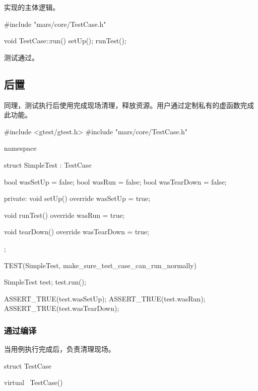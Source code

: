\begin{content}
实现的主体逻辑。

\begin{leftbar}
 \begin{c++}[caption={\ttfamily{src/mars/core/TestCase.cc}}]
#include "mars/core/TestCase.h"

void TestCase::run() {
  setUp();
  runTest();
}
 \end{c++}
\end{leftbar}

测试通过。

\subsection{后置}

同理，测试执行后使用完成现场清理，释放资源。用户通过定制私有的虚函数完成此功能。

\begin{leftbar}
 \begin{c++}[caption={\ttfamily{test/mars/core/TestCaseSpec.cc}}]
#include <gtest/gtest.h>
#include "mars/core/TestCase.h"

namespace {
  struct SimpleTest : TestCase {
    bool wasSetUp = false;
    bool wasRun = false;
    bool wasTearDown = false;

  private:
    void setUp() override {
      wasSetUp = true;
    }

    void runTest() override {
      wasRun = true;
    }

    void tearDown() override {
      wasTearDown = true;
    }
  };
}

TEST(SimpleTest, make_sure_test_case_can_run_normally) {
  SimpleTest test;
  test.run();

  ASSERT_TRUE(test.wasSetUp);
  ASSERT_TRUE(test.wasRun);
  ASSERT_TRUE(test.wasTearDown);  
}
 \end{c++}
\end{leftbar}

\subsubsection{通过编译}

当用例执行完成后，负责清理现场。

\begin{leftbar}
 \begin{c++}[caption={\ttfamily{include/mars/core/TestCase.h}}]
struct TestCase {
  virtual ~TestCase() {}

}
\end{c++}
\end{leftbar}
\end{content}
